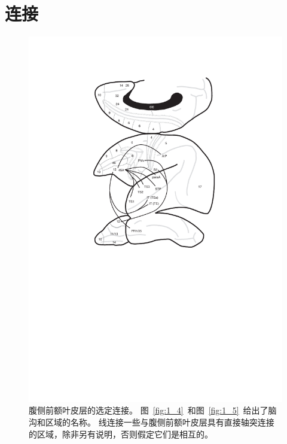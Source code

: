 \section{连接}
\begin{figure}
	\centering
	\includegraphics[width=0.7\linewidth]{chap7/7_2}
	\caption{腹侧前额叶皮层的选定连接。
		图~\ref{fig:1_4}~和图~\ref{fig:1_5}~给出了脑沟和区域的名称。
		线连接一些与腹侧前额叶皮层具有直接轴突连接的区域，除非另有说明，否则假定它们是相互的。\label{fig:7_2}}
\end{figure}


